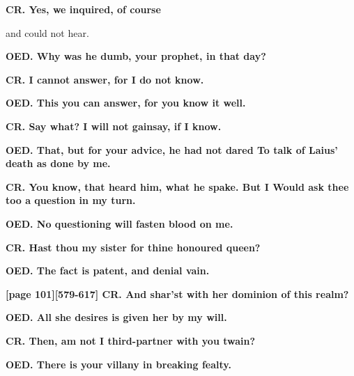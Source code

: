 \documentclass[11pt,letter]{book}
\begin{document}
\par \textbf{CR. Yes, we inquired, of course}
\par   and could not hear.

\par \textbf{OED. Why was he dumb, your prophet, in that day?}
\par 

\par \textbf{CR. I cannot answer, for I do not know.}
\par 

\par \textbf{OED. This you can answer, for you know it well.}
\par 

\par \textbf{CR. Say what? I will not gainsay, if I know.}
\par 

\par \textbf{OED. That, but for your advice, he had not dared To talk of Laius’ death as done by me.}
\par 

\par \textbf{CR. You know, that heard him, what he spake. But I Would ask thee too a question in my turn.}
\par 

\par \textbf{OED. No questioning will fasten blood on me.}
\par 

\par \textbf{CR. Hast thou my sister for thine honoured queen?}
\par 

\par \textbf{OED. The fact is patent, and denial vain.}
\par 

\par \textbf{[page 101][579-617] CR. And shar’st with her dominion of this realm?}
\par 

\par \textbf{OED. All she desires is given her by my will.}
\par 

\par \textbf{CR. Then, am not I third-partner with you twain?}
\par 

\par \textbf{OED. There is your villany in breaking fealty.}
\par 
\end{document}
